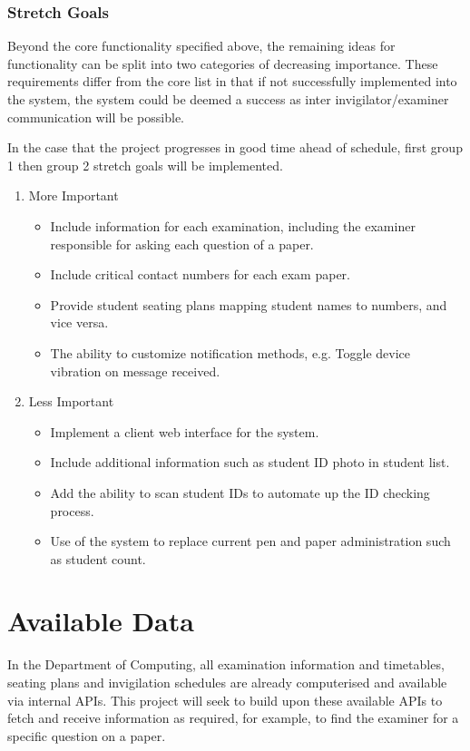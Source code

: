\subsubsection{Stretch Goals}

Beyond the core functionality specified above, the remaining ideas for functionality can be split into two categories of decreasing importance.  These requirements differ from the core list in that if not successfully implemented into the system, the system could be deemed a success as inter invigilator/examiner communication will be possible.

In the case that the project progresses in good time ahead of schedule, first group 1 then group 2 stretch goals will be implemented.

\begin{enumerate}
\item More Important
\begin{itemize}
\item Include information for each examination, including the examiner responsible for asking each question of a paper.
\item Include critical contact numbers for each exam paper.
\item Provide student seating plans mapping student names to numbers, and vice versa.
\item The ability to customize notification methods, e.g. Toggle device vibration on message received.
\end{itemize}

\item Less Important

\begin{itemize}
\item Implement a client web interface for the system.
\item Include additional information such as student ID photo in student list.
\item Add the ability to scan student IDs to automate up the ID checking process.
\item Use of the system to replace current pen and paper administration such as student count.
\end{itemize}
\end{enumerate}

\section{Available Data}

In the Department of Computing, all examination information and timetables, seating plans and invigilation schedules are already computerised and available via internal APIs.  This project will seek to build upon these available APIs to fetch and receive information as required, for example, to find the examiner for a specific question on a paper.

